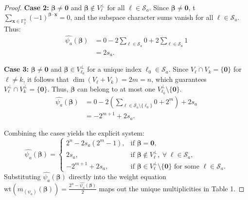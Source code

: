 \documentclass[10pt,a4paper]{amsart}
\begin{document}
\begin{proof}
\textbf{Case 2:} $\mathbf{\beta} \neq \mathbf{0}$ and $\mathbf{\beta} \notin V_\ell^\perp$ for all $\ell \in \mathcal{S}_a$.
Since $\mathbf{\beta} \neq \mathbf{0}$, t$\sum_{\mathbf{x} \in \mathbb{F}_2^n} (-1)^{\mathbf{\beta} \cdot \mathbf{x}} = 0$, and the subspace character sums vanish for all $\ell \in \mathcal{S}_a$. Thus:
\begin{align*}
\widehat{\psi_a}(\mathbf{\beta}) &= 0 - 2 \sum_{\ell \in \mathcal{S}_a} 0 + 2\sum_{\ell \in \mathcal{S}_a} 1 \\
&= 2s_a.
\end{align*}

\textbf{Case 3:} $\mathbf{\beta} \neq \mathbf{0}$ and $\mathbf{\beta} \in V_{\ell_0}^\perp$ for a unique index $\ell_0 \in \mathcal{S}_a$. 
Since $V_\ell \cap V_k = \{\mathbf{0}\}$ for $\ell \neq k$, it follows that $\dim(V_\ell + V_k) = 2m = n$, which guarantees $V_\ell^\perp \cap V_k^\perp = \{\mathbf{0}\}$. Thus, $\mathbf{\beta}$ can belong to at most one $V_{\ell_0}^\perp \setminus \{\mathbf{0}\}$.
\begin{align*}
\widehat{\psi_a}(\mathbf{\beta}) &= 0 - 2 \left( \sum_{\ell \in \mathcal{S}_a \setminus \{\ell_0\}} 0 + 2^m \right) + 2s_a \\
&= -2^{m+1} + 2s_a.
\end{align*}

Combining the cases yields the explicit system:
\[
\widehat{\psi_a}(\mathbf{\beta})=
\begin{cases}
2^n-2s_a(2^m-1), & \text{if } \mathbf{\beta}=\mathbf{0},\\
2s_a, & \text{if } \mathbf{\beta}\notin V_\ell^\perp,\ \forall \; \ell\in \mathcal{S}_a,\\
-2^{m+1}+2s_a, & \text{if } \mathbf{\beta}\in V_\ell^\perp\setminus\{\mathbf{0}\} \text{ for some } \ell\in \mathcal{S}_a.
\end{cases}
\]
Substituting $\widehat{\psi_a}(\mathbf{\beta})$ directly into the weight equation $\mathrm{wt}(m_{(\psi_a)}(\mathbf{\beta})) = \frac{2^n - \widehat{\psi_a}(\mathbf{\beta})}{2}$ maps out the unique multiplicities in Table 1.
\end{proof}
\end{document}
